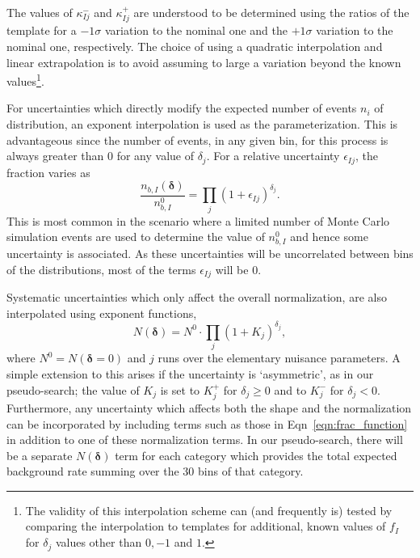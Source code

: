 \documentclass[11pt]{article}
\begin{document}
The values of $\kappa_{Ij}^{-}$ and $\kappa_{Ij}^{+}$ are understood to be determined using the ratios of the template for a $-1\sigma$ variation to the nominal one and the $+1\sigma$
variation to the nominal one, respectively. The choice of using a quadratic interpolation and linear extrapolation is to avoid assuming to large a variation beyond the known
values\footnote{The validity of this interpolation scheme can (and frequently is) tested by comparing the interpolation to templates for additional, known values of $f_{I}$ for $\delta_{j}$ values other than $0,-1$ and $1$.}.

For uncertainties which directly modify the expected number of events $n_{i}$ of distribution, an exponent interpolation is used as the parameterization.
This is advantageous since the number of events, in any given bin, for this process is always greater than 0 for any value of $\delta_{j}$. For a relative uncertainty $\epsilon_{Ij}$, the fraction varies as
%
\begin{equation}
 \frac{n_{b,I}(\bm{\delta})}{n_{b,I}^{0}}  =  \prod_{j} (1+\epsilon_{Ij})^{\delta_{j}}.
  \label{eqn:bin_function}
\end{equation}
%
This is most common in the scenario where a limited number of Monte Carlo simulation events are used to determine the value of $n_{b,I}^{0}$
and hence some uncertainty is associated. As these uncertainties will be uncorrelated between bins of the distributions, most of the terms $\epsilon_{Ij}$ will be 0.

Systematic uncertainties which only affect the overall normalization, are also interpolated using exponent functions,
%
\begin{equation}
 N(\bm{\delta})  =   N^{0} \cdot \prod_{j} (1+K_{j})^{\delta_{j}},
 \label{eqn:norm_function}
\end{equation}
%
where $N^{0} = N(\bm{\delta}=0)$ and $j$ runs over the elementary nuisance parameters.  A simple extension to this arises if the uncertainty is `asymmetric', as in our pseudo-search;
the value of $K_{j}$ is set to $K^{+}_{j}$ for $\delta_{j}\geq0$ and to $K^{-}_{j}$ for $\delta_{j} < 0$. Furthermore, any uncertainty which affects both the
shape and the normalization can be incorporated by including terms such as those in Eqn~\ref{eqn:frac_function} in addition to one of these normalization terms.
In our pseudo-search, there will be a separate $N(\bm{\delta})$ term for each category which provides the total expected background rate summing over the 30 bins of that category.
\end{document}
